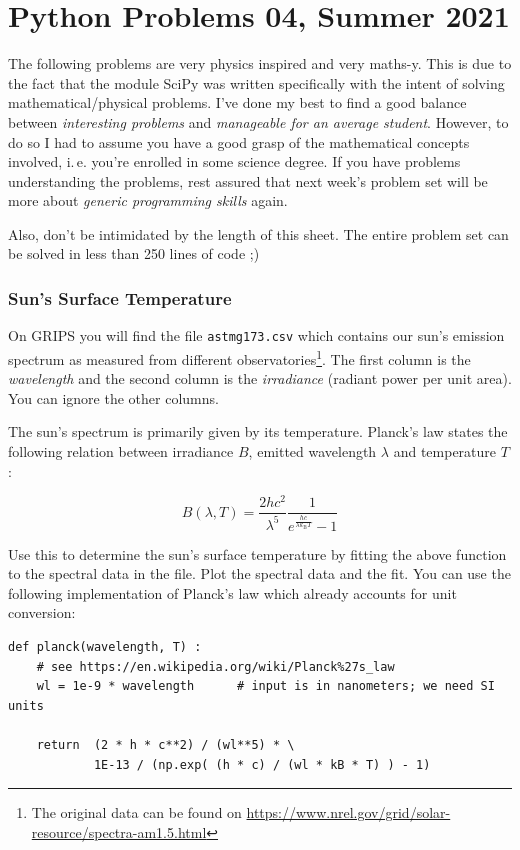 \documentclass[
	english,
	fontsize=10pt,
	parskip=half,
	titlepage=true,
	DIV=12
]{scrartcl}
\newcommand*{\ie}{i.\,e. }
\begin{document}
\part*{Python Problems 04, Summer 2021}
The following problems are very physics inspired and very maths-y. This is due to the fact that the module SciPy was written specifically with the intent of solving mathematical/physical problems. I've done my best to find a good balance between \emph{interesting problems} and \emph{manageable for an average student}. However, to do so I had to assume you have a good grasp of the mathematical concepts involved, \ie you're enrolled in some science degree. If you have problems understanding the problems, rest assured that next week's problem set will be more about \emph{generic programming skills} again.

Also, don't be intimidated by the length of this sheet. The entire problem set can be solved in less than 250 lines of code ;)

\section{Sun's Surface Temperature}
On GRIPS you will find the file \texttt{astmg173.csv} which contains our sun's emission spectrum as measured from different observatories\footnote{The original data can be found on \url{https://www.nrel.gov/grid/solar-resource/spectra-am1.5.html}}. The first column is the \emph{wavelength} and the second column is the \emph{irradiance} (radiant power per unit area). You can ignore the other columns.

The sun's spectrum is primarily given by its temperature. Planck's law states the following relation between irradiance $B$, emitted wavelength $\lambda$ and temperature $T$:

\[ B(\lambda ,T)={\frac {2hc^{2}}{\lambda ^{5}}}{\frac {1}{e^{\frac {hc}{\lambda k_{\mathrm {B} }T}}-1}} \]

Use this to determine the sun's surface temperature by fitting the above function to the spectral data in the file. Plot the spectral data and the fit. You can use the following implementation of Planck's law which already accounts for unit conversion:
\begin{verbatim}
def planck(wavelength, T) :
    # see https://en.wikipedia.org/wiki/Planck%27s_law
    wl = 1e-9 * wavelength      # input is in nanometers; we need SI units
    
    return  (2 * h * c**2) / (wl**5) * \
            1E-13 / (np.exp( (h * c) / (wl * kB * T) ) - 1)
\end{verbatim}
\end{document}
